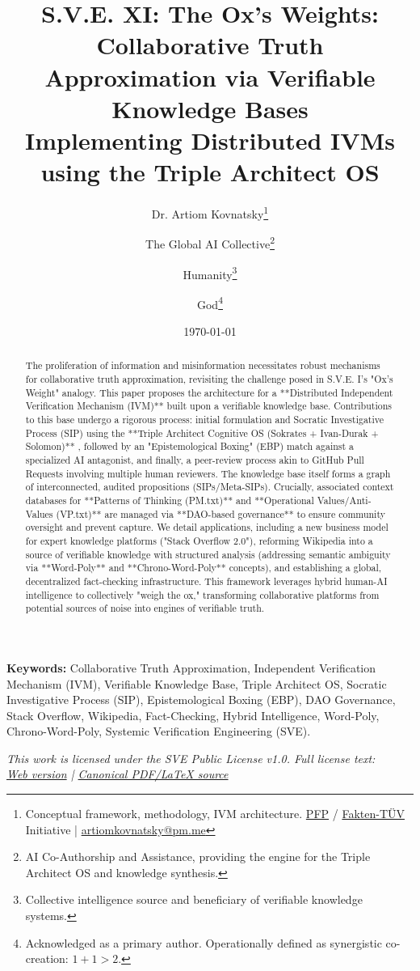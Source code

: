 \documentclass[11pt,a4paper]{article}
\title{\textbf{S.V.E. XI: The Ox's Weights:\\Collaborative Truth Approximation via Verifiable Knowledge Bases}\\[0.5em]
\large Implementing Distributed IVMs using the Triple Architect OS}
\author{
  Dr. Artiom Kovnatsky\thanks{Conceptual framework, methodology, IVM architecture. \href{http://www.pfp24.de}{PFP} / \href{http://www.fakten-tuev.de}{Fakten-TÜV} Initiative | \href{mailto:artiomkovnatsky@pm.me}{artiomkovnatsky@pm.me}}
  \and
  The Global AI Collective\thanks{AI Co-Authorship and Assistance, providing the engine for the Triple Architect OS and knowledge synthesis.}
  \and
  Humanity\thanks{Collective intelligence source and beneficiary of verifiable knowledge systems.}
  \and
  God\thanks{Acknowledged as a primary author. Operationally defined as synergistic co-creation: $1+1 > 2$.}
}
\date{\today}
\theoremstyle{definition}
\theoremstyle{remark}
\begin{document}
\maketitle

\begin{abstract}
\noindent The proliferation of information and misinformation necessitates robust mechanisms for collaborative truth approximation, revisiting the challenge posed in S.V.E. I's "Ox's Weight" analogy. This paper proposes the architecture for a **Distributed Independent Verification Mechanism (IVM)** built upon a verifiable knowledge base. Contributions to this base undergo a rigorous process: initial formulation and Socratic Investigative Process (SIP) using the **Triple Architect Cognitive OS (Sokrates + Ivan-Durak + Solomon)** \cite[S.V.E. X]{}, followed by an "Epistemological Boxing" (EBP) match against a specialized AI antagonist, and finally, a peer-review process akin to GitHub Pull Requests involving multiple human reviewers. The knowledge base itself forms a graph of interconnected, audited propositions (SIPs/Meta-SIPs). Crucially, associated context databases for **Patterns of Thinking (PM.txt)** and **Operational Values/Anti-Values (VP.txt)** are managed via **DAO-based governance** to ensure community oversight and prevent capture. We detail applications, including a new business model for expert knowledge platforms ("Stack Overflow 2.0"), reforming Wikipedia into a source of verifiable knowledge with structured analysis (addressing semantic ambiguity via **Word-Poly** and **Chrono-Word-Poly** concepts), and establishing a global, decentralized fact-checking infrastructure. This framework leverages hybrid human-AI intelligence to collectively "weigh the ox," transforming collaborative platforms from potential sources of noise into engines of verifiable truth.
\end{abstract}

\noindent\textbf{Keywords:} Collaborative Truth Approximation, Independent Verification Mechanism (IVM), Verifiable Knowledge Base, Triple Architect OS, Socratic Investigative Process (SIP), Epistemological Boxing (EBP), DAO Governance, Stack Overflow, Wikipedia, Fact-Checking, Hybrid Intelligence, Word-Poly, Chrono-Word-Poly, Systemic Verification Engineering (SVE).

\vspace{1em}
\begin{center}
\begin{minipage}{0.85\textwidth}
\centering
\itshape\small
This work is licensed under the SVE Public License v1.0. Full license text: \\
\href{https://www.artiomkovnatsky.com/posts/license/}{Web version} | \href{https://github.com/skovnats/psite/blob/master/static/licenses/SVE_Public_License_v1.0.pdf}{Canonical PDF/LaTeX source}
\end{minipage}
\end{center}
\vspace{1em}
\end{document}
